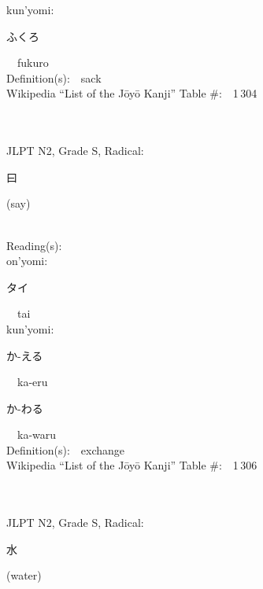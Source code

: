 \begin{multicols}{2}
{\hspace*{1em}}kun'yomi:\ \ \\
{\hspace*{2em}}{\begin{CJK}{UTF8}{min} ふくろ \end{CJK}}\ \ fukuro\ \ \\
Definition(s):\ \ sack \\
Wikipedia ``List of the J\=oy\=o Kanji'' Table \#:\ \ 1\,304 \\
\ \ \\
{\fontsize{34pt}{40pt}  }\ \ \\  %
{JLPT N2, Grade S, Radical:\ \ {\begin{CJK}{UTF8}{min} 曰 \end{CJK}} (say) } \\
Reading(s):\ \ \\
{\hspace*{1em}}on'yomi:\ \ \\
{\hspace*{2em}}{\begin{CJK}{UTF8}{min} タイ \end{CJK}}\ \ tai\ \ \\
{\hspace*{1em}}kun'yomi:\ \ \\
{\hspace*{2em}}{\begin{CJK}{UTF8}{min} か-える \end{CJK}}\ \ ka-eru\ \ \\
{\hspace*{2em}}{\begin{CJK}{UTF8}{min} か-わる \end{CJK}}\ \ ka-waru\ \ \\
Definition(s):\ \ exchange \\
Wikipedia ``List of the J\=oy\=o Kanji'' Table \#:\ \ 1\,306 \\
\ \ \\
{\fontsize{34pt}{40pt}  }\ \ \\  %
{JLPT N2, Grade S, Radical:\ \ {\begin{CJK}{UTF8}{min} 水 \end{CJK}} (water) } \\

\end{multicols}
